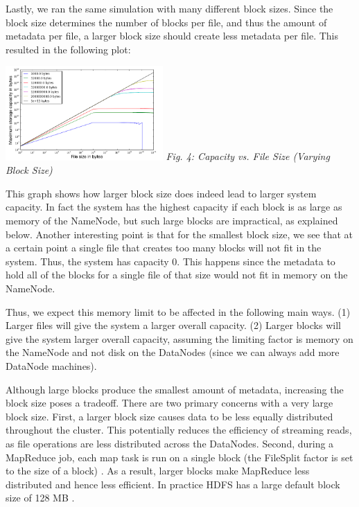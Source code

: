 \documentclass[11pt, a4paper]{article}
\begin{document}
\begin{multicols*}{2}
Lastly, we ran the same simulation with many different block sizes.  Since the block size determines the number of blocks per file, and thus the amount of metadata per file, a larger block size should create less metadata per file. This resulted in the following plot:
\begin{center}
	\includegraphics[keepaspectratio=true, width=0.45\textwidth]{variableBlockSize}	
	\textit{Fig. 4: Capacity vs. File Size (Varying Block Size)}
\end{center}

This graph shows how larger block size does indeed lead to larger system capacity. In fact the system has the highest capacity if each block is as large as memory of the NameNode, but such large blocks are impractical, as explained below. Another interesting point is that for the smallest block size, we see that at a certain point a single file that creates too many blocks will not fit in the system. Thus, the system has capacity 0. This happens since the metadata to hold all of the blocks for a single file of that size would not fit in memory on the NameNode. 

Thus, we expect this memory limit to be affected in the following main ways. (1) Larger files will give the system a larger overall capacity. (2) Larger blocks will give the system larger overall capacity, assuming the limiting factor is memory on the NameNode and not disk on the DataNodes (since we can always add more DataNode machines).

Although large blocks produce the smallest amount of metadata, increasing the block size poses a tradeoff. There are two primary concerns with a very large block size. First, a larger block size causes data to be less equally distributed throughout the cluster. This potentially reduces the efficiency of streaming reads, as file operations are less distributed across the DataNodes. Second, during a MapReduce job, each map task is run on a single block (the FileSplit factor is set to the size of a block) \cite{HdfsDefaults}. As a result, larger blocks make MapReduce less distributed and hence less efficient. In practice HDFS has a large default block size of 128 MB \cite{HdfsDefaults}.


\end{multicols*}
\end{document}
